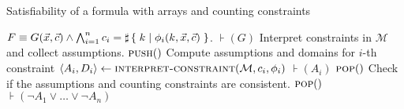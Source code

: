 \begin{algorithm}[h]
\caption{Satisfiability of a formula with arrays and counting constraints}
\begin{algorithmic}[1]
\Require $F \equiv G(\vec{x}, \vec{c}) \land \bigwedge_{i=1}^n c_i = \sharp\left\lbrace\;k\;|\;\phi_i(k, \vec{x}, \vec{c})\;\right\rbrace$.
\State $\assert(G)$
    \LineComment Interpret constraints in $\mathcal{M}$ and collect assumptions.
    \State $\textsc{push}()$
        \LineComment Compute assumptions and domains for $i$-th constraint
        \State $\langle A_i, D_i \rangle \gets \textsc{interpret-constraint}(\mathcal{M}, c_i, \phi_i)$
        \State $\assert(A_i)$
			\State $\textsc{pop}()$
            \State {}
            \State {}
        \EndIf
    \EndFor
    \State {}
    \State {}
    \State {}
    \State {}
    \State {}
    \LineComment Check if the assumptions and counting constraints are consistent.
        \State {}
    \EndIf
    \State $\textsc{pop}()$
    \State $\assert(\lnot A_1 \vee \ldots \vee \lnot A_n)$
\EndWhile
\State \Return{\unsat}
\EndProcedure
\end{algorithmic}
\label{arrayalgo}
\end{algorithm}

\newpage

